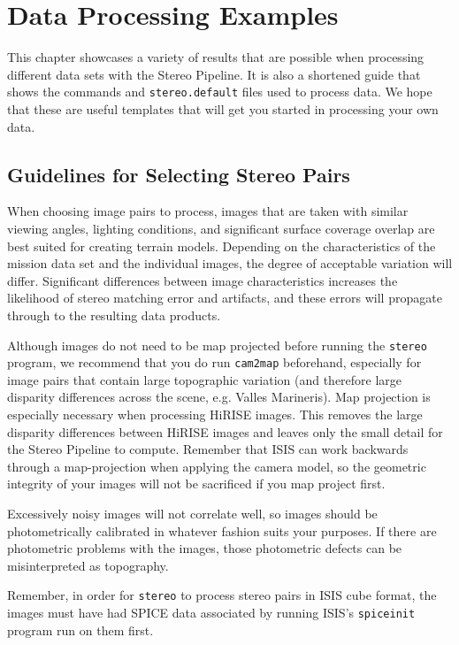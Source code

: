\chapter{Data Processing Examples}
\label{ch:examples}


This chapter showcases a variety of results that are possible when
processing different data sets with the Stereo Pipeline. It is also
a shortened guide that shows the commands and \texttt{stereo.default}
files used to process data. We hope that these are useful templates
that will get you started in processing your own data.

\section{Guidelines for Selecting Stereo Pairs}

When choosing image pairs to process, images that are taken with
similar viewing angles, lighting conditions, and significant surface
coverage overlap are best suited for creating terrain
models. Depending on the characteristics of the mission data set and
the individual images, the degree of acceptable variation will
differ. Significant differences between image characteristics
increases the likelihood of stereo matching error and artifacts, and
these errors will propagate through to the resulting data products.

Although images do not need to be map projected before running the
\texttt{stereo} program, we recommend that you do run {\tt cam2map}
beforehand, especially for image pairs that contain large topographic
variation (and therefore large disparity differences across the
scene, e.g. Valles Marineris).  Map projection is especially necessary
when processing \ac{HiRISE} images. This removes the large disparity
differences between \ac{HiRISE} images and leaves only the small
detail for the Stereo Pipeline to compute. Remember that \ac{ISIS}
can work backwards through a map-projection when applying the camera
model, so the geometric integrity of your images will not be sacrificed
if you map project first.

Excessively noisy images will not correlate well, so images should be
photometrically calibrated in whatever fashion suits your purposes. If
there are photometric problems with the images, those photometric
defects can be misinterpreted as topography.

Remember, in order for \texttt{stereo} to process stereo pairs in
\ac{ISIS} cube format, the images must have had SPICE data associated
by running ISIS's \texttt{spiceinit} program run on them first.


